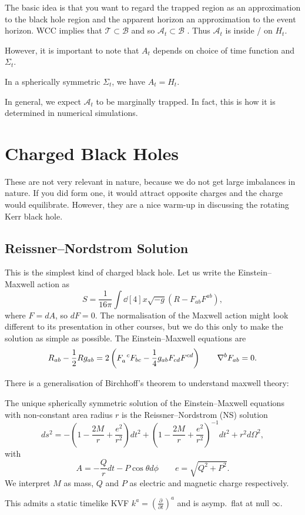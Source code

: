 The basic idea is that you want to regard the trapped region as an approximation to the black hole region and the apparent horizon an approximation to the event horizon.
WCC implies that $\mathcal{T} \subset \mathcal{B}$  and so $\mathcal{A}_t \subset \mathcal{B}$ . Thus $\mathcal{A}_t$  is inside / on $H_t$.

However, it is important to note that  $A_t$  depends on choice of time function and $\Sigma_t$.
 \begin{example}[Kruskal]
  In a spherically symmetric $\Sigma_t$, we have $A_t = H_t$.
\end{example}
In general, we expect $\mathcal{A}_t$  to be marginally trapped. In fact, this is how it is determined in numerical simulations.


\chapter{Charged Black Holes}%
\label{cha:charged_black_holes}

These are not very relevant in nature, because we do not get large imbalances in nature. If you did form one, it would attract opposite charges and the charge would equilibrate.
However, they are a nice warm-up in discussing the rotating Kerr black hole.

\section{Reissner--Nordstrom Solution}%
\label{sec:reissner_nordstrom_solution}

This is the simplest kind of charged black hole.
Let us write the Einstein--Maxwell action as
\begin{equation}
  S = \frac{1}{16 \pi} \int \dd[4]{x} \sqrt{-g} \left( R - F_{ab} F^{ab} \right),
\end{equation}
where $F = dA$, so $dF = 0$.
The normalisation of the Maxwell action might look different to its presentation in other courses, but we do this only to make the solution as simple as possible.
The Einstein--Maxwell equations are
\begin{equation}
  R_{ab} - \frac{1}{2} R g_{ab} = 2 \left( F\indices{_{a}^{c}} F_{bc} - \frac{1}{4} g_{ab} F_{cd} F^{cd} \right) \qquad \nabla^{b} F_{ab} = 0.
\end{equation}

There is a generalisation of Birchhoff's theorem to understand maxwell theory:
\begin{theorem}[]
  The unique spherically symmetric solution of the Einstein--Maxwell equations with non-constant area radius $r$ is the Reissner--Nordstrom (NS) solution
  \begin{equation}
  ds^2 = -\left( 1 - \frac{2M}{r} + \frac{e^2}{r^2} \right) dt^2 + \left( 1 - \frac{2M}{r} + \frac{e^2}{r^2} \right)^{-1} dt^2 + r^2 d\Omega^2,
  \end{equation}
  with
  \begin{equation}
    A = -\frac{Q}{r} dt - P \cos \theta d\phi \qquad e = \sqrt{Q^2 + P^2}.
  \end{equation}
  We interpret $M$ as mass, $Q$ and $P$ as electric and magnetic charge respectively.
\end{theorem}

This admits a static timelike KVF $k^a = \left( \frac{\partial }{\partial t} \right)^a$ and is asymp.~flat at null $\infty$.
